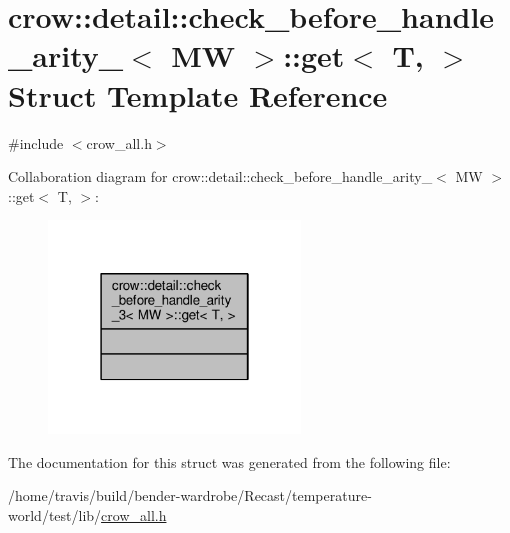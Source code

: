 \hypertarget{structcrow_1_1detail_1_1check__before__handle__arity__3_1_1get}{\section{crow\-:\-:detail\-:\-:check\-\_\-before\-\_\-handle\-\_\-arity\-\_$<$ M\-W $>$\-:\-:get$<$ T, $>$ Struct Template Reference}
\label{structcrow_1_1detail_1_1check__before__handle__arity__3_1_1get}
}


{\ttfamily \#include $<$crow\-\_\-all.\-h$>$}



Collaboration diagram for crow\-:\-:detail\-:\-:check\-\_\-before\-\_\-handle\-\_\-arity\-\_$<$ M\-W $>$\-:\-:get$<$ T, $>$\-:
\nopagebreak
\begin{figure}[H]
\begin{center}
\leavevmode
\includegraphics[width=190pt]{structcrow_1_1detail_1_1check__before__handle__arity__3_1_1get__coll__graph}
\end{center}
\end{figure}


The documentation for this struct was generated from the following file\-:\begin{DoxyCompactItemize}
\item 
/home/travis/build/bender-\/wardrobe/\-Recast/temperature-\/world/test/lib/\hyperlink{crow__all_8h}{crow\-\_\-all.\-h}\end{DoxyCompactItemize}
